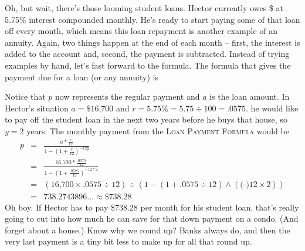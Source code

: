 Oh, but wait, there's those looming student loans.  Hector currently owes \$ at 5.75\% interest compounded monthly.  He's ready to start paying some of that loan off every month, which means this loan repayment is another example of an annuity.  Again, two things happen at the end of each month -- first, the interest is added to the account and, second, the payment is subtracted.  Instead of trying examples by hand, let's fast forward to the formula.  The formula that gives the payment due for a loan (or any annuity) is

 \bigskip
\bigskip

Notice that $p$ now represents the regular payment and $a$ is the loan amount.
In Hector's situation $a = \$\text{16,700}$ and $r=5.75\%=5.75 \div 100=.0575$. he would like to pay off the student loan in the next two years before he buys that house, so $y=2$ years.  The monthly payment from the  \textsc{Loan Payment Formula} would be
\begin{eqnarray*}
p & = &   \frac{a  \ast \frac{r}{12}}{1-\left( 1 + \frac{r}{12}\right) ^{-12y}} \\
& = &    \frac{\text{16,700} \ast \frac{.0575}{12}}{1-\left( 1 + \frac{.0575}{12}\right) ^{-12\ast 2}}\\
& =  & \left(\text{16,700} \times .0575 \div 12 \right) \div \left(1-(1+.0575 \div 12) \wedge (\text{(-)}12 \times 2)\right) \\
& =  & 738.2743896\ldots  \approx \$738.28
\end{eqnarray*}
Oh boy.  If Hector has to pay \$738.28 per month for his student loan, that's really going to cut into how much he can save for that down payment on a condo.  (And forget about a house.) Know why we round up?  Banks always do, and then the very last payment is a tiny bit less to make up for all that round up.

